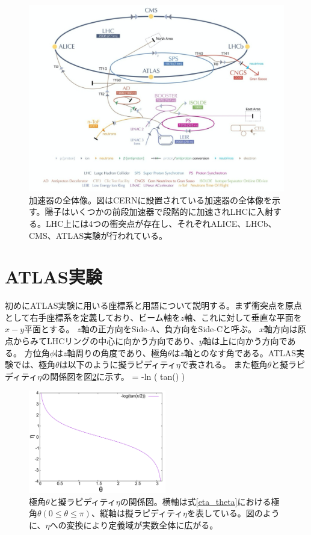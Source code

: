 \begin{figure}[bpt]\centering
\includegraphics[width=12cm]{./LHC_overview.png}
\caption[加速器の全体像]{加速器の全体像\cite{1-1}。図はCERNに設置されている加速器の全体像を示す。陽子はいくつかの前段加速器で段階的に加速されLHCに入射する。LHC上には4つの衝突点が存在し、それぞれALICE、LHCb、CMS、ATLAS実験が行われている。}
\label{LHC_overview}
\end{figure}

\section{ATLAS実験}
初めにATLAS実験に用いる座標系と用語について説明する。まず衝突点を原点として右手座標系を定義しており、ビーム軸を$z$軸、これに対して垂直な平面を$x-y$平面とする。
$z$軸の正方向をSide-A、負方向をSide-Cと呼ぶ。
$x$軸方向は原点からみてLHCリングの中心に向かう方向であり、$y$軸は上に向かう方向である。
方位角$\phi$は$z$軸周りの角度であり、極角$\theta$は$z$軸とのなす角である。ATLAS実験では、極角$\theta$は以下のように擬ラピディティ$\eta$で表される。
また極角$\theta$と擬ラピディティ$\eta$の関係図を図\ref{eta_theta_graph}に示す。
\bbb
\eta = -\rm{ln \left( tan\left(\right) \right) }
\label{eta_theta}
\eee

\begin{figure}[bpt]\centering
\includegraphics[width=6cm]{./data/eta_theta_relation.pdf}
\caption[極角$\theta$と擬ラピディティ$\eta$の関係図]{極角$\theta$と擬ラピディティ$\eta$の関係図。横軸は式\ref{eta_theta}における極角$\theta (0\leq\theta\leq\pi)$、縦軸は擬ラピディティ$\eta$を表している。図のように、$\eta$への変換により定義域が実数全体に広がる。}
\label{eta_theta_graph}
\end{figure}

